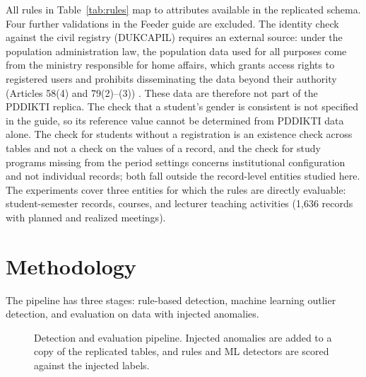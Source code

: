 \documentclass[conference]{IEEEtran}
\begin{document}
All rules in Table~\ref{tab:rules} map to attributes available in the replicated schema. Four further validations in the Feeder guide are excluded. The identity check against the civil registry (DUKCAPIL) requires an external source: under the population administration law, the population data used for all purposes come from the ministry responsible for home affairs, which grants access rights to registered users and prohibits disseminating the data beyond their authority (Articles 58(4) and 79(2)--(3)) \cite{uu24_2013}. These data are therefore not part of the PDDIKTI replica. The check that a student's gender is consistent is not specified in the guide, so its reference value cannot be determined from PDDIKTI data alone. The check for students without a registration is an existence check across tables and not a check on the values of a record, and the check for study programs missing from the period settings concerns institutional configuration and not individual records; both fall outside the record-level entities studied here. The experiments cover three entities for which the rules are directly evaluable: student-semester records, courses, and lecturer teaching activities (1{,}636 records with planned and realized meetings).


\section{Methodology}\label{sec:method}
The pipeline has three stages: rule-based detection, machine learning outlier detection, and evaluation on data with injected anomalies.

\begin{figure}[htbp]
\centering
{}
\caption{Detection and evaluation pipeline. Injected anomalies are added to a copy of the replicated tables, and rules and ML detectors are scored against the injected labels.}
\label{fig:pipeline}
\end{figure}
\end{document}
